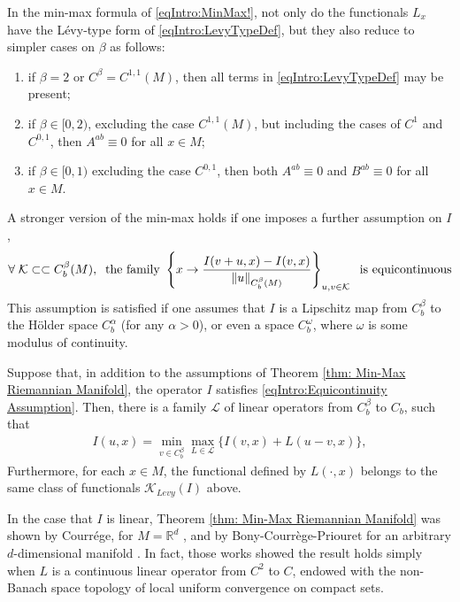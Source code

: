 \documentclass[11pt,reqno]{amsart}
\numberwithin{equation}{section}
\theoremstyle{plain}
\def\K{\mathcal K}
\begin{document}
\begin{prop}\label{prop:CasesOnBetaForMinMax}
	In the min-max formula of \eqref{eqIntro:MinMax!}, not only do the functionals $L_x$ have the L\'evy-type form of \eqref{eqIntro:LevyTypeDef}, but they also reduce to simpler cases on $\beta$ as follows:
	\begin{enumerate}
		\item if $\beta=2$ or $C^\beta=C^{1,1}(M)$, then all terms in \eqref{eqIntro:LevyTypeDef} may be present;
		\item if $\beta\in [0,2)$, excluding the case $C^{1,1}(M)$, but including the cases of $C^1$ and $C^{0,1}$, then $A^{ab}\equiv 0$ for all $x\in M$;
		\item if $\beta\in [0,1)$ excluding the case $C^{0,1}$, then both $A^{ab}\equiv 0$ and $B^{ab}\equiv 0$ for all $x\in M$. 
	\end{enumerate}
\end{prop}

A stronger version of the min-max holds if one imposes a further assumption on $I$, 
\begin{align}\label{eqIntro:Equicontinuity Assumption}
  \forall\; \mathcal{K}\subset\subset C^\beta_b(M),\;\;\textnormal{the family }  \left \{ x\to \frac{I(v+u,x)-I(v,x)}{\|u\|_{C^\beta_b(M)}} \right \}_{u,v\in \mathcal{K}}\;\textnormal{ is equicontinuous} 
\end{align}
This assumption is satisfied if one assumes that $I$ is a Lipschitz map from  $C^{\beta}_b$ to the H\"older space $C^\alpha_b$  (for any $\alpha>0$), or even a space $C^{\omega}_b$, where $\omega$ is some modulus of continuity. 

\begin{thm}\label{thm: Min-Max Riemannian Manifold With Operators}
  Suppose that, in addition to the assumptions of Theorem \ref{thm: Min-Max Riemannian Manifold}, the operator $I$ satisfies \eqref{eqIntro:Equicontinuity Assumption}. Then, there is a family $\mathcal{L}$ of linear operators from $C^\beta_b$ to $C_b$, such that
  \begin{align}
    I(u,x) = \min_{v\in C^\beta_b}\max_{L\in \mathcal{L}}\{ I(v,x)+L(u-v,x)\},
  \end{align}
  Furthermore, for each $x\in M$, the functional defined by $L(\cdot,x)$ belongs to the same class of functionals $\K_{Levy}(I)$ above.
\end{thm}	




\begin{rem}
	In the case that $I$ is linear, Theorem \ref{thm: Min-Max Riemannian Manifold} was shown by Courr\'ege, for $M = \mathbb{R}^d$ {\cite[Theorem 1.5]{Courrege-1965formePrincipeMaximum}}, and by Bony-Courr\`ege-Priouret for an arbitrary $d$-dimensional manifold \cite{BonyCourregePriouret-1966FellerSemiGroupOnDifferentialVariety}.  In fact, those works showed the result holds simply when $L$ is a continuous linear operator from $C^2$ to $C$, endowed with the non-Banach space topology of local uniform convergence on compact sets.
\end{rem}
\end{document}
